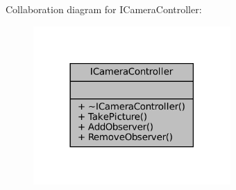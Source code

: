 Collaboration diagram for I\+Camera\+Controller\+:\nopagebreak
\begin{figure}[H]
\begin{center}
\leavevmode
\includegraphics[width=213pt]{classICameraController__coll__graph}
\end{center}
\end{figure}
